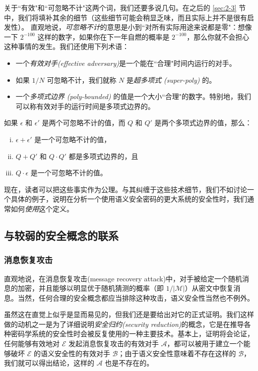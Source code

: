 关于``有效"和``可忽略不计"这两个词，我们还要多说几句。在之后的 \ref{sec:2-3} 节中，我们将填补其余的细节（这些细节可能会稍显乏味，而且实际上并不是很有启发性）。 直观地说，\emph{可忽略不计}的意思是小到``对所有实际用途来说都是零"：想像一下 $2^{-100}$ 这样的数字，如果你在下一年自燃的概率是 $2^{-100}$，那么你就不会担心这种事情的发生。我们还使用下列术语：
\begin{itemize}
	\item 一个\emph{有效对手(effective adversary)}是一个能在``合理"时间内运行的对手。
	\item 如果 $1/N$ 可忽略不计，我们就称 $N$ 是\emph{超多项式 (super-poly)} 的。
	\item 一个\emph{多项式边界 (poly-bounded)} 的值是一个大小``合理"的数字。特别地，我们可以称有效对手的运行时间是多项式边界的。
\end{itemize}

\begin{fact}\label{fact:2-6}
如果 $\epsilon$ 和 $\epsilon'$ 是两个可忽略不计的值，而 $Q$ 和 $Q'$ 是两个多项式边界的值，那么：
\begin{enumerate}[(i)]
	\item $\epsilon+\epsilon'$ 是一个可忽略不计的值，
	\item $Q + Q'$ 和 $Q\cdot Q'$ 都是多项式边界的，且
	\item $Q\cdot\epsilon$ 是一个可忽略不计的值。
\end{enumerate}
\end{fact}

现在，读者可以把这些事实作为公理。与其纠缠于这些技术细节，我们不如讨论一个具体的例子，说明在分析一个使用语义安全密码的更大系统的安全性时，我们通常如何\emph{使用}这个定义。

\subsection{与较弱的安全概念的联系}\label{subsec:2-2-3}

\subsubsection{消息恢复攻击}\label{subsubsec:2-2-3-1}

直观地说，在消息恢复攻击(message recovery attack)中，对手被给定一个随机消息的加密，并且能够以明显优于随机猜测的概率（即 $1/|\mathcal{M}|$）从密文中恢复消息。当然，任何合理的安全概念都应当排除这种攻击，语义安全性当然也不例外。

虽然这在直觉上似乎是显而易见的，但我们还是要给出对它的正式证明。我们这样做的动机之一是为了详细说明\emph{安全归约(security reduction)}的概念，它是在推导各种密码学系统的安全性时会被反复使用的一种主要技术。基本上，证明将会论证，任何能够有效地对 $\mathcal{E}$ 发起消息恢复攻击的有效对手 $\mathcal{A}$，都可以被用于建立一个能够破坏 $\mathcal{E}$ 的语义安全性的有效对手 $\mathcal{B}$；由于语义安全性意味着不存在这样的 $\mathcal{B}$，我们就可以得出结论，这样的 $\mathcal{A}$ 也是不存在的。

